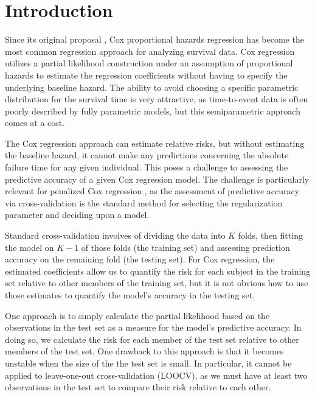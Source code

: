 \section{Introduction}
\par Since its original proposal \citep{Cox1972}, Cox proportional hazards regression has become the most common regression approach for analyzing survival data.  Cox regression utilizes a partial likelihood construction under an assumption of proportional hazards to estimate the regression coefficients without having to specify the underlying baseline hazard.  The ability to avoid choosing a specific parametric distribution for the survival time is very attractive, as time-to-event data is often poorly described by fully parametric models, but this semiparametric approach comes at a cost.

\par The Cox regression approach can estimate relative risks, but without estimating the baseline hazard, it cannot make any predictions concerning the absolute failure time for any given individual.  This poses a challenge to assessing the predictive accuracy of a given Cox regression model.  The challenge is particularly relevant for penalized Cox regression \citep{Tibshirani1997,Fan2002}, as the assessment of predictive accuracy via cross-validation is the standard method for selecting the regularization parameter and deciding upon a model.

\par Standard cross-validation involves of dividing the data into $K$ folds, then fitting the model on $K-1$ of those folds (the training set) and assessing prediction accuracy on the remaining fold (the testing set).  For Cox regression, the estimated coefficients allow us to quantify the risk for each subject in the training set relative to other members of the training set, but it is not obvious how to use those estimates to quantify the model's accuracy in the testing set.

\par One approach is to simply calculate the partial likelihood based on the observations in the test set as a measure for the model's predictive accuracy.  In doing so, we calculate the risk for each member of the test set relative to other members of the test set.  One drawback to this approach is that it becomes unstable when the size of the the test set is small.  In particular, it cannot be applied to leave-one-out cross-validation (LOOCV), as we must have at least two observations in the test set to compare their risk relative to each other.

